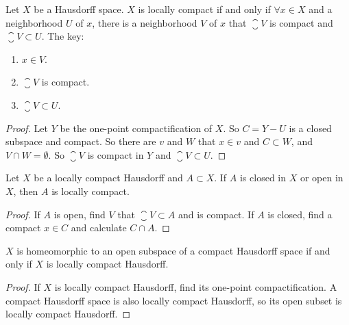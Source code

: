 \begin{theorem}
    Let $X$ be a Hausdorff space. $X$ is locally compact if and only if $\forall x \in X$ and a neighborhood $U$ of $x$, there is a neighborhood $V$ of $x$ that $\closure{V}$ is compact and $\closure{V} \subset U$.
    The key:
    \begin{enumerate}
        \item $x \in V$.
        \item $\closure{V}$ is compact.
        \item $\closure{V} \subset U$.
    \end{enumerate}
\end{theorem}
\begin{proof}
    Let $Y$ be the one-point compactification of $X$. So $C = Y - U$ is a closed subspace and compact. So there are $v$ and $W$ that $x \in v$ and $C \subset W$, and $V \cap W = \emptyset$. So $\closure{V}$ is compact in $Y$ and $\closure{V} \subset U$.
\end{proof}

\begin{theorem}
    Let $X$ be a locally compact Hausdorff and $A \subset X$. If $A$ is closed in $X$ or open in $X$, then $A$ is locally compact.
\end{theorem}
\begin{proof}
    If $A$ is open, find $V$ that $\closure{V} \subset A$ and is compact. If $A$ is closed, find a compact $x \in C$ and calculate $C \cap A$.
\end{proof}

\begin{theorem}
    $X$ is homeomorphic to an open subspace of a compact Hausdorff space if and only if $X$ is locally compact Hausdorff.
\end{theorem}
\begin{proof}
    If $X$ is locally compact Hausdorff, find its one-point compactification. A compact Hausdorff space is also locally compact Hausdorff, so its open subset is locally compact Hausdorff.
\end{proof}



















